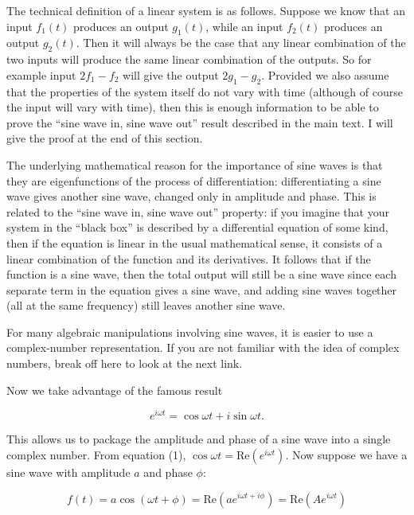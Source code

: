   The technical definition of a linear system is as follows. Suppose we know 
  that an input $f_1(t)$ produces an output $g_1(t)$, while an input $f_2(t)$ 
  produces an output $g_2(t)$. Then it will always be the case that any linear 
  combination of the two inputs will produce the same linear combination of the 
  outputs. So for example input $2f_1-f_2$ will give the output $2g_1-g_2$. 
  Provided we also assume that the properties of the system itself do not vary 
  with time (although of course the input will vary with time), then this is 
  enough information to be able to prove the ``sine wave in, sine wave out'' 
  result described in the main text. I will give the proof at the end of this 
  section. 

  The underlying mathematical reason for the importance of sine waves is that 
  they are eigenfunctions of the process of differentiation: differentiating a 
  sine wave gives another sine wave, changed only in amplitude and phase. This 
  is related to the ``sine wave in, sine wave out'' property: if you imagine 
  that your system in the ``black box'' is described by a differential equation 
  of some kind, then if the equation is linear in the usual mathematical sense, 
  it consists of a linear combination of the function and its derivatives. It 
  follows that if the function is a sine wave, then the total output will still 
  be a sine wave since each separate term in the equation gives a sine wave, 
  and adding sine waves together (all at the same frequency) still leaves 
  another sine wave. 

  For many algebraic manipulations involving sine waves, it is easier to use a 
  complex-number representation. If you are not familiar with the idea of 
  complex numbers, break off here to look at the next link. 

  Now we take advantage of the famous result 

  \begin{equation*}e^{i \omega t}=\cos \omega t+i\sin \omega t . 
  \tag{1}\end{equation*} 

  This allows us to package the amplitude and phase of a sine wave into a 
  single complex number. From equation (1), $\cos\omega t=\mathrm{Re}(e^{i 
  \omega t})$. Now suppose we have a sine wave with amplitude $a$ and phase 
  $\phi$: 

  \begin{equation*}f(t)=a\cos(\omega t + \phi)=\mathrm{Re}(ae^{i \omega 
  t+i\phi})=\mathrm{Re}(Ae^{i \omega t}) \tag{2}\end{equation*} 

